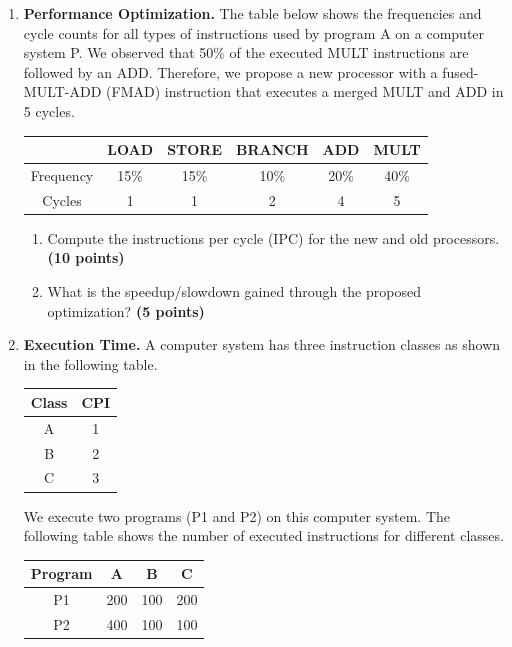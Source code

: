 \documentclass[a4paper, 15pt]{exam}
\begin{document}
\begin{enumerate}
	\item \textbf {Performance Optimization.}
   The table below shows the frequencies and cycle counts for all types of instructions used by program A on a computer system P. We observed that 50\% of the executed MULT instructions are followed by an ADD. Therefore, we propose a new processor with a fused-MULT-ADD (FMAD) instruction that executes a merged MULT and ADD in 5 cycles.


   \begin{center}
\begin{tabular}{ |c|c|c|c|c|c| } 
 \hline
  & LOAD & STORE & BRANCH & ADD & MULT \\ 
  \hline
 Frequency & 15\% & 15\% & 10\% & 20\% & 40\% \\ 
 Cycles & 1 & 1 & 2 &4 & 5 \\ 

\hline
\end{tabular}
\end{center}
	\begin{enumerate}
    \item Compute the instructions per cycle (IPC) for the new and old processors. \textbf{(10 points)}
        \item What is the speedup/slowdown gained through the proposed optimization?  \textbf{(5 points)}

	\end{enumerate}
    \item \textbf{Execution Time.} A computer system has three instruction classes as shown in the following table.
\begin{center}
\begin{tabular}{ |c|c|} 
 \hline
  
  Class&CPI\\ 
  \hline
 A&1\\ 
 \hline
 B&2\\ 
 \hline
 C&3\\ 
 \hline
\end{tabular}
\end{center}
We execute two programs (P1 and P2) on this computer system. The following table shows the number of executed instructions for different classes.

\begin{center}
\begin{tabular}{ |c|c|c|c|} 
 \hline
  
  Program&A&B&C\\ 
  \hline
 P1&200&100&200\\ 
 \hline
 P2&400&100&100\\ 
 \hline
 

\end{tabular}
\end{center}
\end{enumerate}
\end{document}
